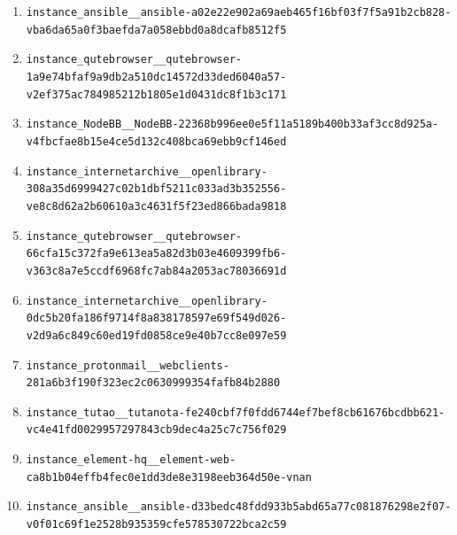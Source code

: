 \begin{enumerate}
\item \texttt{instance\_\allowbreak{}ansible\_\allowbreak{}\_\allowbreak{}ansible-\allowbreak{}a02e22e902a69a\allowbreak{}eb465f16bf03f7\allowbreak{}f5a91b2cb828-\allowbreak{}vba6da65a0f3ba\allowbreak{}efda7a058ebbd0\allowbreak{}a8dcafb8512f5}
\item \texttt{instance\_\allowbreak{}qutebrowser\_\allowbreak{}\_\allowbreak{}qutebrowser-\allowbreak{}1a9e74bfaf9a9d\allowbreak{}b2a510dc14572d\allowbreak{}33ded6040a57-\allowbreak{}v2ef375ac78498\allowbreak{}5212b1805e1d04\allowbreak{}31dc8f1b3c171}
\item \texttt{instance\_\allowbreak{}NodeBB\_\allowbreak{}\_\allowbreak{}NodeBB-\allowbreak{}22368b996ee0e5\allowbreak{}f11a5189b400b3\allowbreak{}3af3cc8d925a-\allowbreak{}v4fbcfae8b15e4\allowbreak{}ce5d132c408bca\allowbreak{}69ebb9cf146ed}
\item \texttt{instance\_\allowbreak{}internetarchiv\allowbreak{}e\_\allowbreak{}\_\allowbreak{}openlibrary-\allowbreak{}308a35d6999427\allowbreak{}c02b1dbf5211c0\allowbreak{}33ad3b352556-\allowbreak{}ve8c8d62a2b606\allowbreak{}10a3c4631f5f23\allowbreak{}ed866bada9818}
\item \texttt{instance\_\allowbreak{}qutebrowser\_\allowbreak{}\_\allowbreak{}qutebrowser-\allowbreak{}66cfa15c372fa9\allowbreak{}e613ea5a82d3b0\allowbreak{}3e4609399fb6-\allowbreak{}v363c8a7e5ccdf\allowbreak{}6968fc7ab84a20\allowbreak{}53ac78036691d}
\item \texttt{instance\_\allowbreak{}internetarchiv\allowbreak{}e\_\allowbreak{}\_\allowbreak{}openlibrary-\allowbreak{}0dc5b20fa186f9\allowbreak{}714f8a83817859\allowbreak{}7e69f549d026-\allowbreak{}v2d9a6c849c60e\allowbreak{}d19fd0858ce9e4\allowbreak{}0b7cc8e097e59}
\item \texttt{instance\_\allowbreak{}protonmail\_\allowbreak{}\_\allowbreak{}webclients-\allowbreak{}281a6b3f190f32\allowbreak{}3ec2c063099935\allowbreak{}4fafb84b2880}
\item \texttt{instance\_\allowbreak{}tutao\_\allowbreak{}\_\allowbreak{}tutanota-\allowbreak{}fe240cbf7f0fdd\allowbreak{}6744ef7bef8cb6\allowbreak{}1676bcdbb621-\allowbreak{}vc4e41fd002995\allowbreak{}7297843cb9dec4\allowbreak{}a25c7c756f029}
\item \texttt{instance\_\allowbreak{}element-\allowbreak{}hq\_\allowbreak{}\_\allowbreak{}element-\allowbreak{}web-\allowbreak{}ca8b1b04effb4f\allowbreak{}ec0e1dd3de8e31\allowbreak{}98eeb364d50e-\allowbreak{}vnan}
\item \texttt{instance\_\allowbreak{}ansible\_\allowbreak{}\_\allowbreak{}ansible-\allowbreak{}d33bedc48fdd93\allowbreak{}3b5abd65a77c08\allowbreak{}1876298e2f07-\allowbreak{}v0f01c69f1e252\allowbreak{}8b935359cfe578\allowbreak{}530722bca2c59}

\end{enumerate}
